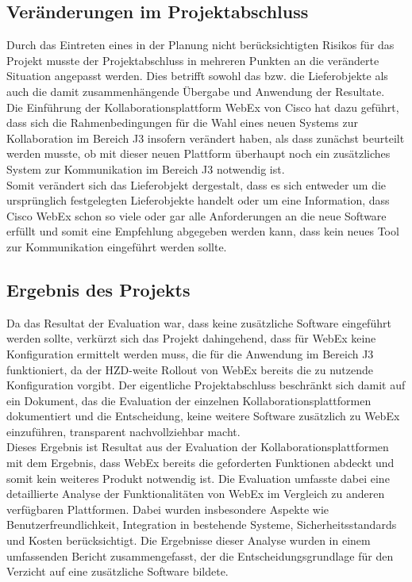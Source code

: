 \documentclass[ThesisDJ.tex]{subfiles}
\begin{document}
	\subsection{Veränderungen im Projektabschluss}
	Durch das Eintreten eines in der Planung nicht berücksichtigten Risikos für das Projekt musste der Projektabschluss in mehreren Punkten an die veränderte Situation angepasst werden. Dies betrifft sowohl das bzw. die Lieferobjekte als auch die damit zusammenhängende Übergabe und Anwendung der Resultate.\\
	Die Einführung der Kollaborationsplattform WebEx von Cisco hat dazu geführt, dass sich die Rahmenbedingungen für die Wahl eines neuen Systems zur Kollaboration im Bereich J3 insofern verändert haben, als dass zunächst beurteilt werden musste, ob mit dieser neuen Plattform überhaupt noch ein zusätzliches System zur Kommunikation im Bereich J3 notwendig ist. \\
	Somit verändert sich das Lieferobjekt dergestalt, dass es sich entweder um die ursprünglich festgelegten Lieferobjekte handelt oder um eine Information, dass Cisco WebEx schon so viele oder gar alle Anforderungen an die neue Software erfüllt und somit eine Empfehlung abgegeben werden kann, dass kein neues Tool zur Kommunikation eingeführt werden sollte.\\
	
	\subsection{Ergebnis des Projekts}
	Da das Resultat der Evaluation war, dass keine zusätzliche Software eingeführt werden sollte, verkürzt sich das Projekt dahingehend, dass für WebEx keine Konfiguration ermittelt werden muss, die für die Anwendung im Bereich J3 funktioniert, da der HZD-weite Rollout von WebEx bereits die zu nutzende Konfiguration vorgibt. Der eigentliche Projektabschluss beschränkt sich damit auf ein Dokument, das die Evaluation der einzelnen Kollaborationsplattformen dokumentiert und die Entscheidung, keine weitere Software zusätzlich zu WebEx einzuführen, transparent nachvollziehbar macht. \\
	Dieses Ergebnis ist Resultat aus der Evaluation der Kollaborationsplattformen mit dem Ergebnis, dass WebEx bereits die geforderten Funktionen abdeckt und somit kein weiteres Produkt notwendig ist. Die Evaluation umfasste dabei eine detaillierte Analyse der Funktionalitäten von WebEx im Vergleich zu anderen verfügbaren Plattformen. Dabei wurden insbesondere Aspekte wie Benutzerfreundlichkeit, Integration in bestehende Systeme, Sicherheitsstandards und Kosten berücksichtigt. Die Ergebnisse dieser Analyse wurden in einem umfassenden Bericht zusammengefasst, der die Entscheidungsgrundlage für den Verzicht auf eine zusätzliche Software bildete. \\
	
\end{document}
